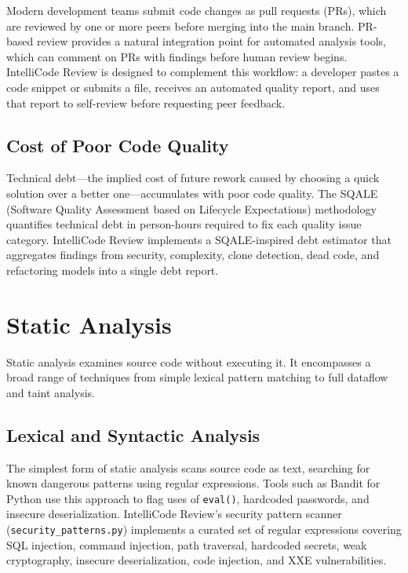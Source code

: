 \documentclass[12pt, oneside]{report}
\begin{document}
Modern development teams submit code changes as pull requests (PRs), which are reviewed
by one or more peers before merging into the main branch. PR-based review provides a natural
integration point for automated analysis tools, which can comment on PRs with findings
before human review begins. IntelliCode Review is designed to complement this workflow: a
developer pastes a code snippet or submits a file, receives an automated quality report,
and uses that report to self-review before requesting peer feedback.

\subsection{Cost of Poor Code Quality}

Technical debt---the implied cost of future rework caused by choosing a quick solution
over a better one---accumulates with poor code quality. The SQALE (Software Quality
Assessment based on Lifecycle Expectations) methodology~\cite{letouzey2012} quantifies
technical debt in person-hours required to fix each quality issue category. IntelliCode
Review implements a SQALE-inspired debt estimator that aggregates findings from security,
complexity, clone detection, dead code, and refactoring models into a single debt report.

\section{Static Analysis}
\label{sec:bg-static}

Static analysis examines source code without executing it. It encompasses a broad range
of techniques from simple lexical pattern matching to full dataflow and taint analysis.

\subsection{Lexical and Syntactic Analysis}

The simplest form of static analysis scans source code as text, searching for known
dangerous patterns using regular expressions. Tools such as Bandit for Python use this
approach to flag uses of \texttt{eval()}, hardcoded passwords, and insecure deserialization.
IntelliCode Review's security pattern scanner (\texttt{security\_patterns.py}) implements
a curated set of regular expressions covering SQL injection, command injection, path
traversal, hardcoded secrets, weak cryptography, insecure deserialization, code injection,
and XXE vulnerabilities.
\end{document}
